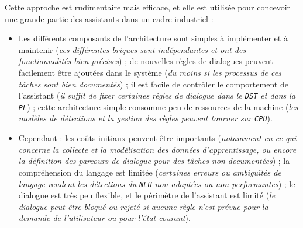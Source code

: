 		
		Cette approche est rudimentaire mais efficace, et elle est utilisée pour concevoir une grande partie des assistants dans un cadre industriel :
		\begin{itemize}
			\item[\faThumbsUp] 
				Les différents composants de l'architecture sont simples à implémenter et à maintenir
				(\textit{ces différentes briques sont indépendantes et ont des fonctionnalités bien précises}) ;
				de nouvelles règles de dialogues peuvent facilement être ajoutées dans le système
				(\textit{du moins si les processus de ces tâches sont bien documentés}) ;
				il est facile de contrôler le comportement de l'assistant
				(\textit{il suffit de fixer certaines règles de dialogue dans le \texttt{DST} et dans la \texttt{PL}}) ;
				cette architecture simple consomme peu de ressources de la machine (\textit{les modèles de détections et la gestion des règles peuvent tourner sur \texttt{CPU}}).
			\item[\faThumbsDown] Cependant :
				les coûts initiaux peuvent être importants (\textit{notamment en ce qui concerne la collecte et la modélisation des données d'apprentissage, ou encore la définition des parcours de dialogue pour des tâches non documentées}) ;
				la compréhension du langage est limitée (\textit{certaines erreurs ou ambiguïtés de langage rendent les détections du \texttt{NLU} non adaptées ou non performantes}) ;
				le dialogue est très peu flexible, et le périmètre de l'assistant est limité (\textit{le dialogue peut être bloqué ou rejeté si aucune règle n'est prévue pour la demande de l'utilisateur ou pour l'état courant}).
		\end{itemize}
		
